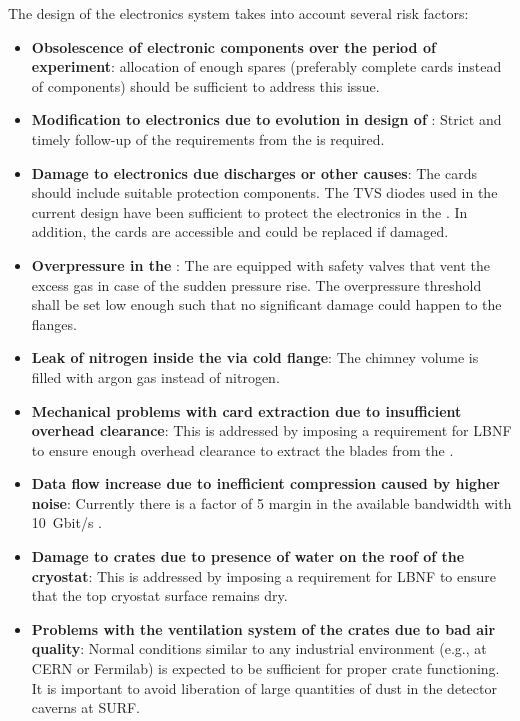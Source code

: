 The design of the \dual electronics system takes into account several risk factors:
\begin{itemize}
\item{\textbf{Obsolescence of electronic components over the period of experiment}: allocation of enough spares (preferably complete cards instead of components) should be sufficient to address this issue. }

\item{\textbf{Modification to  electronics due to evolution in design of }: Strict and timely follow-up of the  requirements from the \dual {} is required.}

\item{\textbf{Damage to electronics due  discharges or other causes}: %
The  cards should include suitable protection components. The TVS diodes used in the current design  have been sufficient to protect the electronics in the . 
 In addition, the cards are accessible and could be replaced if damaged. }
 
\item{\textbf{Overpressure in the }: The  are equipped with safety valves that vent the excess gas in case of the sudden pressure rise. The overpressure threshold %
shall be set low enough such that no significant damage could happen to the flanges. }

\item{\textbf{Leak of nitrogen inside the  via cold flange}: The chimney volume %
is  filled with argon gas instead of nitrogen.}

\item{\textbf{Mechanical problems with  card extraction due to insufficient overhead clearance}: %
This is addressed by imposing a requirement for LBNF to ensure enough overhead clearance to extract the blades from the .}
\item{\textbf{Data flow increase due to inefficient compression caused by higher noise}: Currently there is a factor of \num{5} margin in the available bandwidth with \SI{10}{Gbit/s} .} 
\item{\textbf{Damage to  crates due to presence of water on the roof of the cryostat}: This is addressed by imposing a requirement for LBNF to ensure that the top cryostat surface remains dry.}
\item{\textbf{Problems with the ventilation system of the  crates due to bad air quality}: Normal conditions similar to any industrial environment (e.g., at CERN or Fermilab) %
is expected to be sufficient %
for proper crate functioning. It is important to avoid liberation of large quantities of dust in the detector caverns at SURF.} %
\end{itemize}
